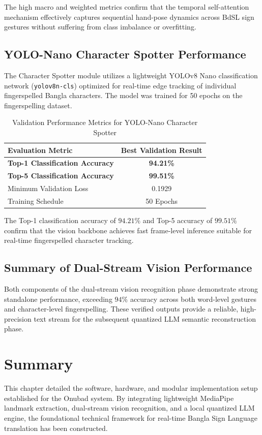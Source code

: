 The high macro and weighted metrics confirm that the temporal self-attention mechanism effectively captures sequential hand-pose dynamics across BdSL sign gestures without suffering from class imbalance or overfitting.

\subsection{YOLO-Nano Character Spotter Performance}
The Character Spotter module utilizes a lightweight YOLOv8 Nano classification network (\texttt{yolov8n-cls}) optimized for real-time edge tracking of individual fingerspelled Bangla characters. The model was trained for 50 epochs on the fingerspelling dataset.

\begin{table}[h]
\centering
\caption{Validation Performance Metrics for YOLO-Nano Character Spotter}
\label{tab:character_metrics}
\begin{tabular}{|l|c|}
\hline
\textbf{Evaluation Metric} & \textbf{Best Validation Result} \\ \hline
\textbf{Top-1 Classification Accuracy} & \textbf{94.21\%} \\ \hline
\textbf{Top-5 Classification Accuracy} & \textbf{99.51\%} \\ \hline
Minimum Validation Loss & 0.1929 \\ \hline
Training Schedule & 50 Epochs \\ \hline
\end{tabular}
\end{table}

The Top-1 classification accuracy of $94.21\%$ and Top-5 accuracy of $99.51\%$ confirm that the vision backbone achieves fast frame-level inference suitable for real-time fingerspelled character tracking.

\subsection{Summary of Dual-Stream Vision Performance}
Both components of the dual-stream vision recognition phase demonstrate strong standalone performance, exceeding $94\%$ accuracy across both word-level gestures and character-level fingerspelling. These verified outputs provide a reliable, high-precision text stream for the subsequent quantized LLM semantic reconstruction phase.

\section{Summary}
This chapter detailed the software, hardware, and modular implementation setup established for the Onubad system. By integrating lightweight MediaPipe landmark extraction, dual-stream vision recognition, and a local quantized LLM engine, the foundational technical framework for real-time Bangla Sign Language translation has been constructed.